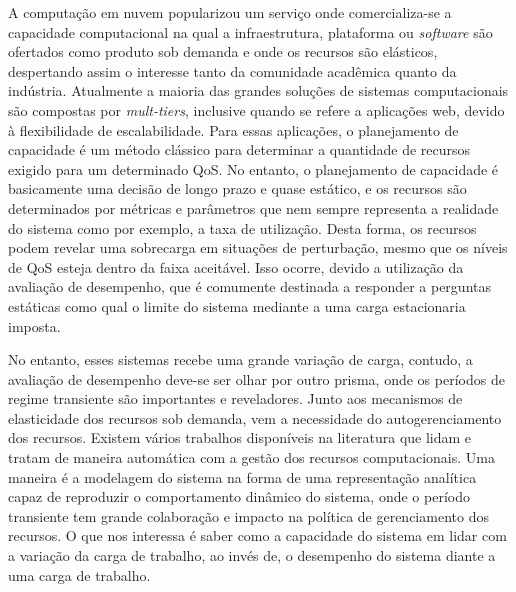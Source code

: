 A computação em nuvem popularizou um serviço onde comercializa-se a capacidade computacional na qual a infraestrutura, plataforma ou \textit{software} são ofertados como produto sob demanda e onde os recursos são elásticos, despertando assim o interesse tanto da comunidade acadêmica quanto da indústria. Atualmente a maioria das grandes soluções de sistemas computacionais são compostas por \textit{mult-tiers}, inclusive quando se refere a aplicações web, devido à flexibilidade de escalabilidade. Para essas aplicações, o planejamento de capacidade é um método clássico para determinar a quantidade de recursos exigido para um determinado QoS. No entanto, o planejamento de capacidade é basicamente uma decisão de longo prazo e quase estático, e os recursos são determinados por métricas e parâmetros que nem sempre representa a realidade do sistema como por exemplo, a taxa de utilização. Desta forma, os recursos podem revelar uma sobrecarga em situações de perturbação, mesmo que os níveis de QoS esteja dentro da faixa aceitável. Isso ocorre, devido a utilização da avaliação de desempenho, que é comumente destinada a responder a perguntas estáticas como qual o limite do sistema mediante a uma carga estacionaria imposta. 

No entanto, esses sistemas recebe uma grande variação de carga, contudo, a avaliação de desempenho deve-se ser olhar por outro prisma, onde os períodos de regime transiente são importantes e reveladores. Junto aos mecanismos de elasticidade dos recursos sob demanda, vem a necessidade do autogerenciamento dos recursos. Existem vários trabalhos disponíveis na literatura que lidam e tratam de maneira automática com a gestão dos recursos computacionais. Uma maneira é a modelagem do sistema na forma de uma representação analítica capaz de reproduzir o comportamento dinâmico do sistema, onde o período transiente tem grande colaboração e impacto na política de gerenciamento dos recursos. O que nos interessa é saber como a capacidade do sistema em lidar com a variação da carga de trabalho, ao invés de, o desempenho do sistema diante a uma carga de trabalho.

